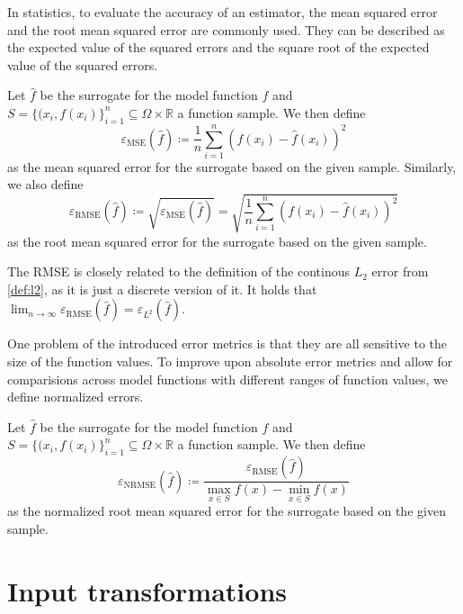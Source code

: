 \documentclass[
  a4paper,  %
  twoside,  %
  bibliography=totoc,
  headsepline,
  cleardoublepage=empty,
  parskip=half,
  draft=false
]{scrbook}
\begin{document}
In statistics, to evaluate the accuracy of an estimator, the mean squared error and the root mean squared error are commonly used.
They can be described as the expected value of the squared errors and the square root of the expected value of the squared errors.
\begin{definition}
Let $\hat{f}$ be the surrogate for the model function $f$ and $S=\{(x_i, f(x_i)\}_{i=1}^n \subseteq \Omega \times \mathds{R}$ a function sample.
We then define
\begin{equation}
\varepsilon_{\text{MSE}}(\hat{f}) \coloneqq \frac{1}{n} \sum_{i=1}^n (f(x_i) - \hat{f}(x_i))^2
\end{equation}
as the mean squared error for the surrogate based on the given sample.
Similarly, we also define
\begin{equation}
\varepsilon_{\text{RMSE}}(\hat{f}) \coloneqq \sqrt{\varepsilon_{\text{MSE}}(\hat{f})} = \sqrt{\frac{1}{n} \sum_{i=1}^n (f(x_i) - \hat{f}(x_i))^2}
\end{equation}
as the root mean squared error for the surrogate based on the given sample.
\end{definition}
The RMSE is closely related to the definition of the continous $L_2$ error from \cref{def:l2}, as it is just a discrete version of it.
It holds that $\lim_{n \to \infty} \varepsilon_{\text{RMSE}}(\hat{f}) = \varepsilon_{\text{$L^2$}}(\hat{f})$.

One problem of the introduced error metrics is that they are all sensitive to the size of the function values.
To improve upon absolute error metrics and allow for comparisions across model functions with different ranges of function values, we define normalized errors.
\begin{definition}
Let $\hat{f}$ be the surrogate for the model function $f$ and $S=\{(x_i, f(x_i)\}_{i=1}^n \subseteq \Omega \times \mathds{R}$ a function sample.
We then define
\begin{equation}
\varepsilon_{\text{NRMSE}}(\hat{f}) \coloneqq \frac{\varepsilon_{\text{RMSE}}(\hat{f})}{\max_{x \in S} f(x) - \min_{x \in S} f(x)}
\end{equation}
as the normalized root mean squared error for the surrogate based on the given sample.
\end{definition}


\chapter{Input transformations}
\label{chap:c3}
\end{document}
